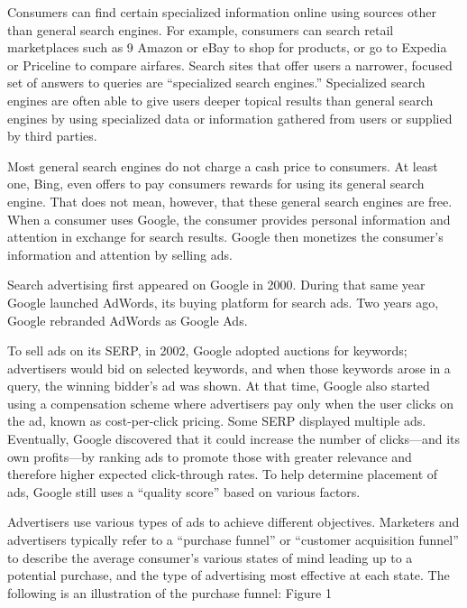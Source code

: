 \documentclass[11pt,b5paper]{scrartcl}
\begin{document}
Consumers can find certain specialized information online using sources other
than general search engines. For example, consumers can search retail marketplaces such as
9
Amazon or eBay to shop for products, or go to Expedia or Priceline to compare airfares. Search
sites that offer users a narrower, focused set of answers to queries are “specialized search
engines.” Specialized search engines are often able to give users deeper topical results than
general search engines by using specialized data or information gathered from users or supplied
by third parties.


Most general search engines do not charge a cash price to consumers. At least
one, Bing, even offers to pay consumers rewards for using its general search engine. That does
not mean, however, that these general search engines are free. When a consumer uses Google,
the consumer provides personal information and attention in exchange for search results. Google
then monetizes the consumer’s information and attention by selling ads.


Search advertising first appeared on Google in 2000. During that same year
Google launched AdWords, its buying platform for search ads. Two years ago, Google rebranded
AdWords as Google Ads.


To sell ads on its SERP, in 2002, Google adopted auctions for keywords;
advertisers would bid on selected keywords, and when those keywords arose in a query, the
winning bidder’s ad was shown. At that time, Google also started using a compensation scheme
where advertisers pay only when the user clicks on the ad, known as cost-per-click pricing. Some
SERP displayed multiple ads. Eventually, Google discovered that it could increase the number of
clicks—and its own profits—by ranking ads to promote those with greater relevance and
therefore higher expected click-through rates. To help determine placement of ads, Google still
uses a “quality score” based on various factors.


Advertisers use various types of ads to achieve different objectives. Marketers and
advertisers typically refer to a “purchase funnel” or “customer acquisition funnel” to describe the
average consumer’s various states of mind leading up to a potential purchase, and the type of
advertising most effective at each state. The following is an illustration of the purchase funnel:
Figure 1
\end{document}
